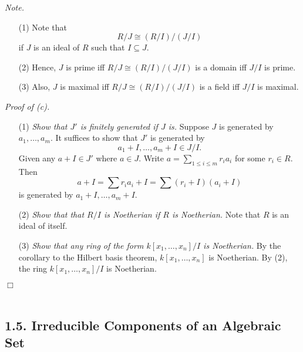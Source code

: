 \documentclass{article}
\begin{document}
\emph{Note.}
\begin{enumerate}
\item[(1)]
  Note that
  \[
    R/J \cong (R/I)/(J/I)
  \]
  if $J$ is an ideal of $R$ such that $I \subseteq J$.

\item[(2)]
  Hence, $J$ is prime iff $R/J \cong (R/I)/(J/I)$ is a domain iff $J/I$ is prime.

\item[(3)]
  Also, $J$ is maximal iff $R/J \cong (R/I)/(J/I)$ is a field iff $J/I$ is maximal. \\
\end{enumerate}



\emph{Proof of (c).}
\begin{enumerate}
\item[(1)]
  \emph{Show that $J'$ is finitely generated if $J$ is.}
  Suppose $J$ is generated by $a_1, \ldots, a_m$.
  It suffices to show that $J'$ is generated by
  \[
    a_1 + I, \ldots, a_m + I \in J/I.
  \]
  Given any $a + I \in J'$ where $a \in J$.
  Write $a = \sum_{1 \leq i \leq m} r_i a_i$ for some $r_i \in R$.
  Then
  \[
    a + I = \sum r_i a_i + I = \sum (r_i + I)(a_i + I)
  \]
  is generated by $a_1 + I, \ldots, a_m + I$.

\item[(2)]
  \emph{Show that that $R/I$ is Noetherian if $R$ is Noetherian.}
  Note that $R$ is an ideal of itself.

\item[(3)]
  \emph{Show that any ring of the form $k[x_1,\ldots,x_n]/I$ is Noetherian.}
  By the corollary to the Hilbert basis theorem,
  $k[x_1,\ldots,x_n]$ is Noetherian.
  By (2), the ring $k[x_1,\ldots,x_n]/I$ is Noetherian.
\end{enumerate}
$\Box$ \\\\






\subsection*{1.5. Irreducible Components of an Algebraic Set \\}
\end{document}
